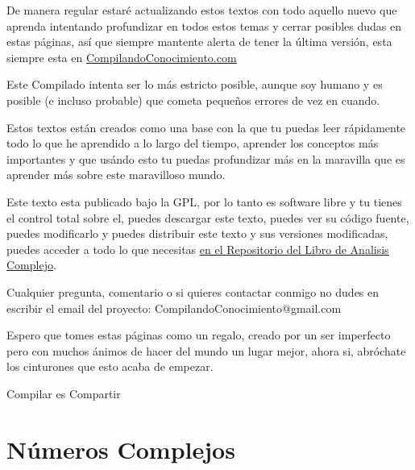 \documentclass[12pt, fleqn]{report}                             %
\begin{document}
    De manera regular estaré actualizando estos textos con todo aquello nuevo que aprenda intentando
    profundizar en todos estos temas y cerrar posibles dudas en estas páginas, así que siempre mantente
    alerta de tener la última versión, esta siempre esta en \href{http://www.CompilandoConocimiento.com}
    {\underline{CompilandoConocimiento.com}} 

    Este Compilado intenta ser lo más estricto posible, aunque soy humano y es posible (e incluso probable) que
    cometa pequeños errores de vez en cuando.

    Estos textos están creados como una base con la que tu puedas leer rápidamente todo lo que he aprendido
    a lo largo del tiempo, aprender los conceptos más importantes y que usándo esto tu puedas profundizar
    más en la maravilla que es aprender más sobre este maravilloso mundo.

    Este texto esta publicado bajo la GPL, por lo tanto es software libre y tu tienes el control total sobre
    el, puedes descargar este texto, puedes ver su código fuente, puedes modificarlo y puedes distribuir este
    texto y sus versiones modificadas, puedes acceder a todo lo que necesitas 
    \href{http://www.github.com/CompilandoConocimiento/LibroAnalisisComplejo}
    {\underline{en el Repositorio del Libro de Analisis Complejo}}. 

    Cualquier pregunta, comentario o si quieres contactar conmigo no dudes en escribir el email del proyecto:
    CompilandoConocimiento@gmail.com

    Espero que tomes estas páginas como un regalo, creado por un ser imperfecto pero con muchos ánimos de hacer
    del mundo un lugar mejor, ahora si, abróchate los cinturones que esto acaba de empezar.

    \begin{flushright}
        Compilar es Compartir
    \end{flushright}




\part{Números Complejos}
\clearpage
\end{document}
